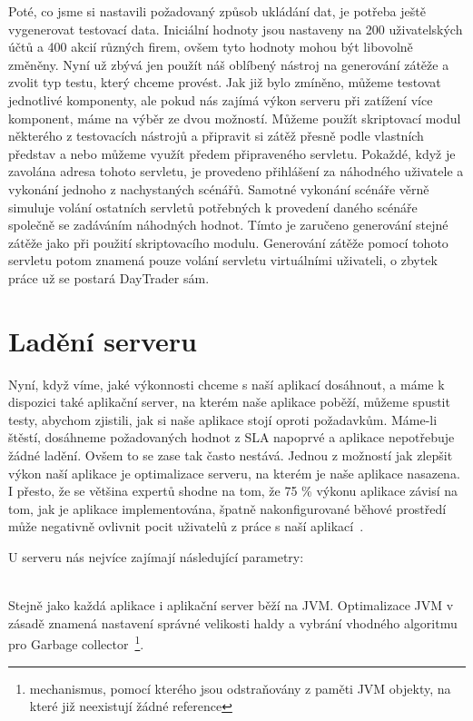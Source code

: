 \documentclass[122pt,oneside]{fithesis}
\begin{document}
Poté, co jsme si nastavili požadovaný způsob ukládání dat, je potřeba ještě vygenerovat testovací data. Iniciální hodnoty jsou nastaveny na 200 uživatelských účtů a 400 akcií různých firem, ovšem tyto hodnoty mohou být libovolně změněny. Nyní už zbývá jen použít náš oblíbený nástroj na generování zátěže a zvolit typ testu, který chceme provést. Jak již bylo zmíněno, můžeme testovat jednotlivé komponenty, ale pokud nás zajímá výkon serveru při zatížení více komponent, máme na výběr ze dvou možností. Můžeme použít skriptovací modul některého z testovacích nástrojů a připravit si zátěž přesně podle vlastních představ a nebo můžeme využít předem připraveného servletu. Pokaždé, když je zavolána adresa tohoto servletu, je provedeno přihlášení za náhodného uživatele a vykonání jednoho z nachystaných scénářů. Samotné vykonání scénáře věrně simuluje volání ostatních servletů potřebných k provedení daného scénáře společně se zadáváním náhodných hodnot. Tímto je zaručeno generování stejné zátěže jako při použití skriptovacího modulu. Generování zátěže pomocí tohoto servletu potom znamená pouze volání servletu virtuálními uživateli, o zbytek práce už se postará DayTrader sám.

\section{Ladění serveru}
Nyní, když víme, jaké výkonnosti chceme s naší aplikací dosáhnout, a máme k dispozici také aplikační server, na kterém naše aplikace poběží, můžeme spustit testy, abychom zjistili, jak si naše aplikace stojí oproti požadavkům. Máme-li štěstí, dosáhneme požadovaných hodnot z SLA napoprvé a aplikace nepotřebuje žádné ladění. Ovšem to se zase tak často nestává. Jednou z možností jak zlepšit výkon naší aplikace je optimalizace serveru, na kterém je naše aplikace nasazena. I přesto, že se většina expertů shodne na tom, že 75 \% výkonu aplikace závisí na tom, jak je aplikace implementována, špatně nakonfigurované běhové prostředí může negativně ovlivnit pocit uživatelů z práce s naší aplikací~\cite{performanceTuning}. 

U serveru nás nejvíce zajímají následující parametry:

\vspace{5 mm}
\\\indent Stejně jako každá aplikace i aplikační server běží na JVM. Optimalizace JVM v zásadě znamená nastavení správné velikosti haldy a vybrání vhodného algoritmu pro Garbage collector~\footnote{mechanismus, pomocí kterého jsou odstraňovány z paměti JVM objekty, na které již neexistují žádné reference}.
\end{document}
